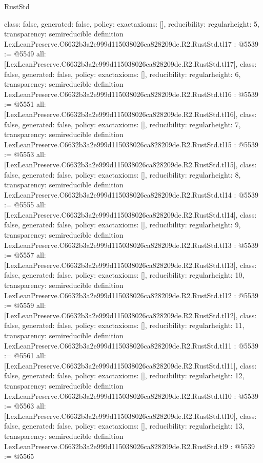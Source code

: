 \begin{lexlean}{RustStd}
\begin{coremodule}
{  class: false,
  generated: false,
  policy: exact{axioms: []},
  reducibility: regular{height: 5},
  transparency: semireducible
}
definition LexLeanPreserve.C6632b3a2e999d115038026ca828209de.R2.RustStd.tl17 : @5539 := @5549 {
  all: [LexLeanPreserve.C6632b3a2e999d115038026ca828209de.R2.RustStd.tl17],
  class: false,
  generated: false,
  policy: exact{axioms: []},
  reducibility: regular{height: 6},
  transparency: semireducible
}
definition LexLeanPreserve.C6632b3a2e999d115038026ca828209de.R2.RustStd.tl16 : @5539 := @5551 {
  all: [LexLeanPreserve.C6632b3a2e999d115038026ca828209de.R2.RustStd.tl16],
  class: false,
  generated: false,
  policy: exact{axioms: []},
  reducibility: regular{height: 7},
  transparency: semireducible
}
definition LexLeanPreserve.C6632b3a2e999d115038026ca828209de.R2.RustStd.tl15 : @5539 := @5553 {
  all: [LexLeanPreserve.C6632b3a2e999d115038026ca828209de.R2.RustStd.tl15],
  class: false,
  generated: false,
  policy: exact{axioms: []},
  reducibility: regular{height: 8},
  transparency: semireducible
}
definition LexLeanPreserve.C6632b3a2e999d115038026ca828209de.R2.RustStd.tl14 : @5539 := @5555 {
  all: [LexLeanPreserve.C6632b3a2e999d115038026ca828209de.R2.RustStd.tl14],
  class: false,
  generated: false,
  policy: exact{axioms: []},
  reducibility: regular{height: 9},
  transparency: semireducible
}
definition LexLeanPreserve.C6632b3a2e999d115038026ca828209de.R2.RustStd.tl13 : @5539 := @5557 {
  all: [LexLeanPreserve.C6632b3a2e999d115038026ca828209de.R2.RustStd.tl13],
  class: false,
  generated: false,
  policy: exact{axioms: []},
  reducibility: regular{height: 10},
  transparency: semireducible
}
definition LexLeanPreserve.C6632b3a2e999d115038026ca828209de.R2.RustStd.tl12 : @5539 := @5559 {
  all: [LexLeanPreserve.C6632b3a2e999d115038026ca828209de.R2.RustStd.tl12],
  class: false,
  generated: false,
  policy: exact{axioms: []},
  reducibility: regular{height: 11},
  transparency: semireducible
}
definition LexLeanPreserve.C6632b3a2e999d115038026ca828209de.R2.RustStd.tl11 : @5539 := @5561 {
  all: [LexLeanPreserve.C6632b3a2e999d115038026ca828209de.R2.RustStd.tl11],
  class: false,
  generated: false,
  policy: exact{axioms: []},
  reducibility: regular{height: 12},
  transparency: semireducible
}
definition LexLeanPreserve.C6632b3a2e999d115038026ca828209de.R2.RustStd.tl10 : @5539 := @5563 {
  all: [LexLeanPreserve.C6632b3a2e999d115038026ca828209de.R2.RustStd.tl10],
  class: false,
  generated: false,
  policy: exact{axioms: []},
  reducibility: regular{height: 13},
  transparency: semireducible
}
definition LexLeanPreserve.C6632b3a2e999d115038026ca828209de.R2.RustStd.tl9 : @5539 := @5565 {
}
\end{coremodule}
\end{lexlean}
